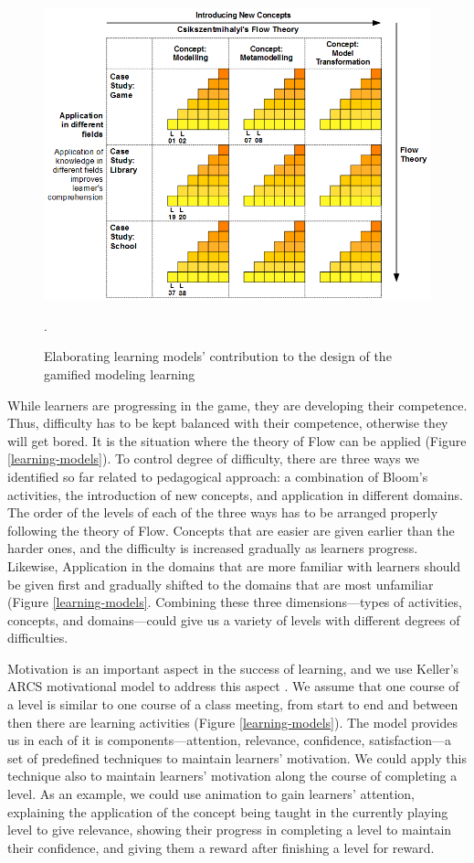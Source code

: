 \documentclass[12pt, a4paper]{report}
\begin{document}
\begin{figure}[ht]
\centering
\includegraphics[width=\textwidth]{learning-models2}
\caption{Elaborating learning models' contribution to the design of the gamified modeling learning}.
\label{learning-models2}
\end{figure}

While learners are progressing in the game, they are developing their competence. Thus, difficulty has to be kept balanced with their competence, otherwise they will get bored. It is the situation where the theory of Flow can be applied (Figure \ref{learning-models}). To control degree of difficulty, there are three ways we identified so far related to pedagogical approach: a combination of Bloom's activities, the introduction of new concepts, and application in different domains. The order of the levels of each of the three ways has to be arranged properly following the theory of Flow. Concepts that are easier are given earlier than the harder ones, and the difficulty is increased gradually as learners progress. Likewise, Application in the domains that are more familiar with learners should be given first and gradually shifted to the domains that are most unfamiliar (Figure \ref{learning-models}. Combining these three dimensions---types of activities, concepts, and domains---could give us a variety of levels with different degrees of difficulties.

Motivation is an important aspect in the success of learning, and we use Keller's ARCS motivational model to address this aspect \cite{keller2010motivational}. We assume that one course of a level is similar to one course of a class meeting, from start to end and between then there are learning activities (Figure \ref{learning-models}). The model provides us in each of it is components---attention, relevance, confidence, satisfaction---a set of predefined techniques to maintain learners' motivation. We could apply this technique also to maintain learners' motivation along the course of completing a level. As an example, we could use animation to gain learners' attention, explaining the application of the concept being taught in the currently playing level to give relevance, showing their progress in completing a level to maintain their confidence, and giving them a reward after finishing a level for reward.
 
\end{document}
